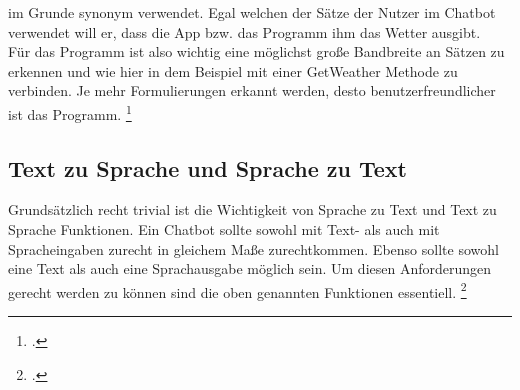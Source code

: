 im Grunde synonym verwendet. Egal welchen der Sätze der Nutzer im Chatbot verwendet will er, dass die App bzw. das Programm ihm das Wetter ausgibt. \\
Für das Programm ist also wichtig eine möglichst große Bandbreite an Sätzen zu erkennen und wie hier in dem Beispiel mit einer GetWeather Methode zu verbinden. Je mehr Formulierungen erkannt werden, desto benutzerfreundlicher ist das Programm. \footcite[][S. 3 ff.]{Bisser.2021}


\subsection{Text zu Sprache und Sprache zu Text} %
\label{sub:Text zu Sprache und Sprache zu Text}

Grundsätzlich recht trivial ist die Wichtigkeit von Sprache zu Text und Text zu Sprache Funktionen. Ein Chatbot sollte sowohl mit Text- als auch mit Spracheingaben zurecht in gleichem Maße zurechtkommen. Ebenso sollte sowohl eine Text als auch eine Sprachausgabe möglich sein. Um diesen Anforderungen gerecht werden zu können sind die oben genannten Funktionen essentiell. \footcite[][S. 6 f.]{Bisser.2021}


